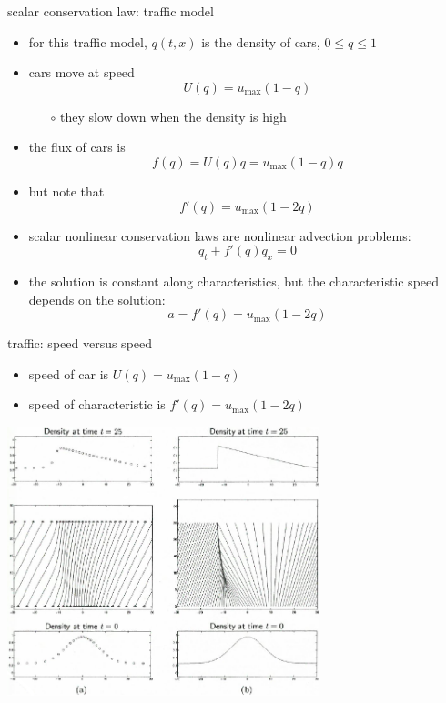 \documentclass[10pt,hyperref,dvipsnames]{beamer}
\begin{document}
\begin{frame}{scalar conservation law: traffic model}

\begin{itemize}
\item for this traffic model, $q(t,x)$ is the density of cars, $0\le q \le 1$
\item cars move at speed
    $$U(q) = u_{\max} (1-q)$$

    \begin{itemize}
    \item[$\circ$] they slow down when the density is high
    \end{itemize}
\item the flux of cars is
    $$f(q) = U(q) q = u_{\max} (1-q) q$$
\item but note that
    $$f'(q) = u_{\max} (1-2q)$$
\item scalar nonlinear conservation laws are nonlinear advection problems:
    $$q_t + f'(q) q_x = 0$$
\item the solution is constant along characteristics, but the characteristic speed depends on the solution:
    $$a = f'(q) = u_{\max} (1-2q)$$
\end{itemize}
\end{frame}


\begin{frame}{traffic: speed versus speed}

\begin{itemize}
\item speed of car is $U(q) = u_{\max} (1-q)$
\item speed of characteristic is $f'(q) = u_{\max} (1-2q)$
\end{itemize}

\begin{center}
\includegraphics[width=0.68\textwidth]{figs/leveque11p1}
\end{center}
\end{frame}
\end{document}
